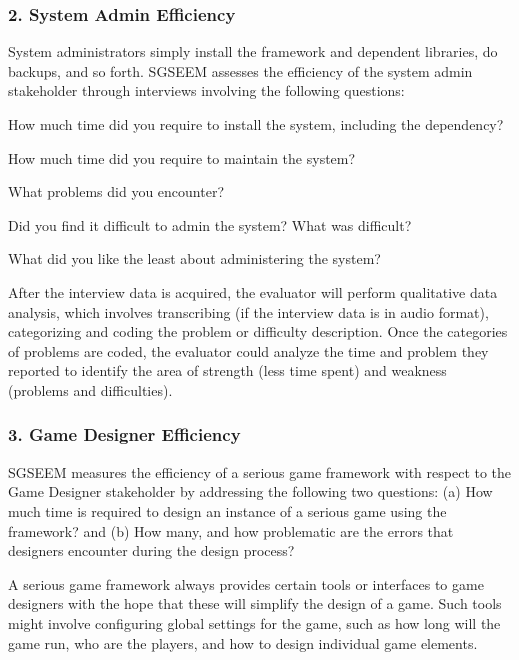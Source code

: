 \documentclass{sigchi}
\begin{document}
\subsubsection{2. System Admin Efficiency}

System administrators simply install the framework and dependent libraries, do backups,
and so forth. SGSEEM assesses the efficiency of the system admin stakeholder through
interviews involving the following questions:

\begin{compactitem}
\item How much time did you require to install the system, including the dependency?
\item How much time did you require to maintain the system?
\item What problems did you encounter?
\item Did you find it difficult to admin the system? What was difficult?
\item What did you like the least about administering the system?
\end{compactitem}

After the interview data is acquired, the evaluator will perform qualitative data
analysis, which involves transcribing (if the interview data is in audio format),
categorizing and coding the problem or difficulty description. Once the categories of
 problems are coded, the evaluator could analyze the time and problem they reported
 to identify the area of strength (less time spent) and weakness (problems and
 difficulties).

\subsubsection{3. Game Designer Efficiency}

SGSEEM measures the efficiency of a serious game framework with respect to the Game
Designer stakeholder by addressing the following two questions: (a) How much time is
required to design an instance of a serious game using the framework? and (b) How many,
and how problematic are the errors that designers encounter during the design process?

A serious game framework always provides certain tools or interfaces to game designers
with the hope that these will simplify the design of a game. Such tools might involve
configuring global settings for the game, such as how long will the game run, who are the
players, and how to design individual game elements.
\end{document}
